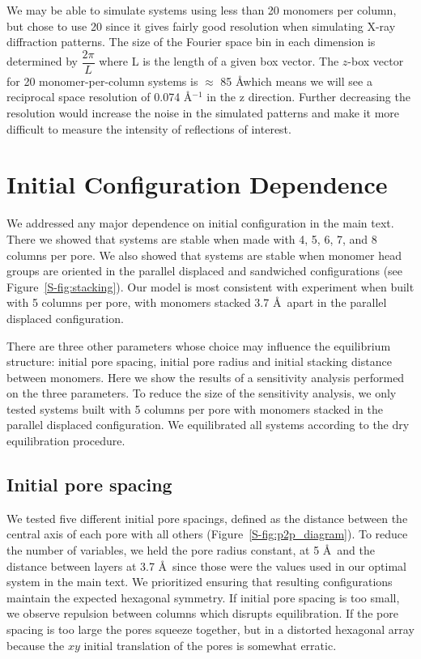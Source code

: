   We may be able to simulate systems using less than 20 monomers per column, but chose
  to use 20 since it gives fairly good resolution when simulating X-ray diffraction 
  patterns. The size of the Fourier space bin in each dimension is determined by 
  $\dfrac{2\pi}{L}$ where L is the length of a given box vector. The $z$-box vector 
  for 20 monomer-per-column systems is $\approx$ 85 \AA which means we will see 
  a reciprocal space resolution of 0.074 \AA$^{-1}$ in the z direction. Further decreasing
  the resolution would increase the noise in the simulated patterns and make it more
  difficult to measure the intensity of reflections of interest.

  \section{Initial Configuration Dependence}\label{S-section:initial_config_dependence}

  We addressed any major dependence on initial configuration in the main text.
  There we showed that systems are stable when made with 4, 5, 6, 7, and 8
  columns per pore. We also showed that systems are stable when monomer head
  groups are oriented in the parallel displaced and sandwiched configurations
  (see Figure~\ref{S-fig:stacking}). Our model is most consistent with experiment
  when built with 5 columns per pore, with monomers stacked 3.7 \AA~apart in 
  the parallel displaced configuration. 

  There are three other parameters whose choice may influence the equilibrium
  structure: initial pore spacing, initial pore radius and initial stacking distance
  between monomers. Here we show the results of a sensitivity analysis performed
  on the three parameters. To reduce the size of the sensitivity analysis, we
  only tested systems built with 5 columns per pore with monomers stacked in 
  the parallel displaced configuration. We equilibrated all systems according
  to the dry equilibration procedure.

  \subsection{Initial pore spacing}\label{S-section:initial_pore_spacing}

  We tested five different initial pore spacings, defined as the
  distance between the central axis of each pore with all others
  (Figure~\ref{S-fig:p2p_diagram}). To reduce the number of variables, we held the
  pore radius constant, at 5 \AA~and the distance between layers at 3.7 \AA~since
  those were the values used in our optimal system in the main text. We
  prioritized ensuring that resulting configurations maintain the expected
  hexagonal symmetry. If initial pore spacing is too small, we observe repulsion
  between columns which disrupts equilibration. If the pore spacing is too large
  the pores squeeze together, but in a distorted hexagonal array because the $xy$
  initial translation of the pores is somewhat erratic. 

